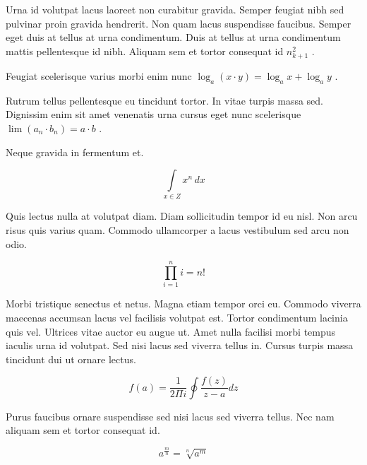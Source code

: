 \documentclass{article}
\begin{document}
	
    Urna id volutpat lacus laoreet non curabitur gravida. Semper feugiat nibh sed pulvinar proin gravida hendrerit. Non quam lacus suspendisse faucibus. Semper eget duis at tellus at urna condimentum. Duis at tellus at urna condimentum mattis pellentesque id nibh. Aliquam sem et tortor consequat id 
    \begin{math}
    n_{k+1}^2
    \end{math}
    .
    \newline
    
    Feugiat scelerisque varius morbi enim nunc 
    $ \log _{a}(x\cdot y)=\log _{a}x+\log _{a}y $
    .
    \newline
    
    Rutrum tellus pellentesque eu tincidunt tortor. In vitae turpis massa sed. Dignissim enim sit amet venenatis urna cursus eget nunc scelerisque
     \( \lim\left ( a_n\cdot b_n \right )=a\cdot b \)
     .
    \newline
    
    Neque gravida in fermentum et. 
    
    \[ \int\limits_{x\in Z}\! x^{n}\, dx  \]
    
    Quis lectus nulla at volutpat diam. Diam sollicitudin tempor id eu nisl. Non arcu risus quis varius quam. Commodo ullamcorper a lacus vestibulum sed arcu non odio.
    
    $$ \prod_{i=1}^ni=n! $$
    
    Morbi tristique senectus et netus. Magna etiam tempor orci eu. Commodo viverra maecenas accumsan lacus vel facilisis volutpat est. Tortor condimentum lacinia quis vel. Ultrices vitae auctor eu augue ut. Amet nulla facilisi morbi tempus iaculis urna id volutpat. Sed nisi lacus sed viverra tellus in. Cursus turpis massa tincidunt dui ut ornare lectus.
    
    \begin{displaymath}
    	f\left ( a \right ) = \frac{1}{2\Pi i} \oint \frac{f\left ( z \right )}{z-a} dz
    \end{displaymath}
    
    Purus faucibus ornare suspendisse sed nisi lacus sed viverra tellus. Nec nam aliquam sem et tortor consequat id.
    
    \begin{equation}
    a^{\frac{m}{n}}=\sqrt[n]{a^{m}}
    \end{equation}
    
\end{document}
